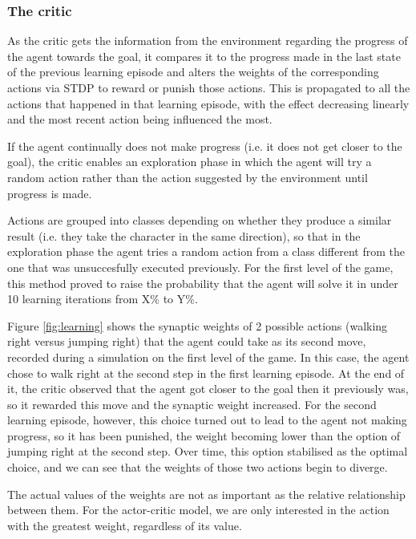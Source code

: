\documentclass[10pt]{article}
\begin{document}
    \subsubsection{The critic}

    As the critic gets the information from the environment regarding the progress of the agent towards the goal, it compares it to the progress made in the last state of the previous learning episode and alters the weights of the corresponding actions via STDP to reward or punish those actions. This is propagated to all the actions that happened in that learning episode, with the effect decreasing linearly and the most recent action being influenced the most.

    If the agent continually does not make progress (i.e. it does not get closer to the goal), the critic enables an exploration phase in which the agent will try a random action rather than the action suggested by the environment until progress is made.

    Actions are grouped into classes depending on whether they produce a similar result (i.e. they take the character in the same direction), so that in the exploration phase the agent tries a random action from a class different from the one that was unsuccesfully executed previously. For the first level of the game, this method proved to raise the probability that the agent will solve it in under 10 learning iterations from X\% to Y\%.

    Figure \ref{fig:learning} shows the synaptic weights of 2 possible actions (walking right versus jumping right) that the agent could take as its second move, recorded during a simulation on the first level of the game. In this case, the agent chose to walk right at the second step in the first learning episode. At the end of it, the critic observed that the agent got closer to the goal then it previously was, so it rewarded this move and the synaptic weight increased. For the second learning episode, however, this choice turned out to lead to the agent not making progress, so it has been punished, the weight becoming lower than the option of jumping right at the second step. Over time, this option stabilised as the optimal choice, and we can see that the weights of those two actions begin to diverge.

    The actual values of the weights are not as important as the relative relationship between them. For the actor-critic model, we are only interested in the action with the greatest weight, regardless of its value.
\end{document}
